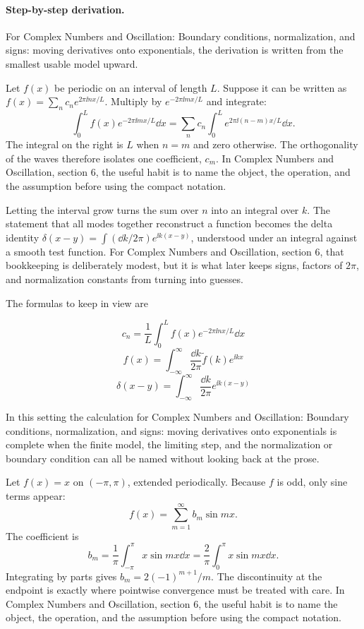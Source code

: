 \paragraph{Step-by-step derivation.}

For Complex Numbers and Oscillation: Boundary conditions, normalization, and signs: moving derivatives onto exponentials, the derivation is written from the smallest usable model upward.

Let \(f(x)\) be periodic on an interval of length \(L\).  Suppose it can be written as \(f(x)=\sum_n c_ne^{2\pi\ii nx/L}\).  Multiply by \(e^{-2\pi\ii mx/L}\) and integrate:
\[
  \int_0^L f(x)e^{-2\pi\ii mx/L}\dd x
  =
  \sum_n c_n\int_0^L e^{2\pi\ii(n-m)x/L}\dd x.
\]
The integral on the right is \(L\) when \(n=m\) and zero otherwise.  The orthogonality of the waves therefore isolates one coefficient, \(c_m\).  In Complex Numbers and Oscillation, section 6, the useful habit is to name the object, the operation, and the assumption before using the compact notation.

Letting the interval grow turns the sum over \(n\) into an integral over \(k\).  The statement that all modes together reconstruct a function becomes the delta identity \(\delta(x-y)=\int(\dd k/2\pi)e^{\ii k(x-y)}\), understood under an integral against a smooth test function.  For Complex Numbers and Oscillation, section 6, that bookkeeping is deliberately modest, but it is what later keeps signs, factors of \(2\pi\), and normalization constants from turning into guesses.

The formulas to keep in view are

\[
  c_n=\frac1L\int_0^L f(x)e^{-2\pi\ii nx/L}\dd x
\]
\[
  f(x)=\int_{-\infty}^{\infty}\frac{\dd k}{2\pi}\tilde f(k)e^{\ii kx}
\]
\[
  \delta(x-y)=\int_{-\infty}^{\infty}\frac{\dd k}{2\pi}e^{\ii k(x-y)}
\]

In this setting the calculation for Complex Numbers and Oscillation: Boundary conditions, normalization, and signs: moving derivatives onto exponentials is complete when the finite model, the limiting step, and the normalization or boundary condition can all be named without looking back at the prose.




\begin{example}
Let \(f(x)=x\) on \((-\pi,\pi)\), extended periodically.  Because \(f\) is odd, only sine terms appear:
\[
  f(x)=\sum_{m=1}^\infty b_m\sin mx.
\]
The coefficient is
\[
  b_m=\frac1\pi\int_{-\pi}^\pi x\sin mx\dd x
  =\frac2\pi\int_0^\pi x\sin mx\dd x.
\]
Integrating by parts gives \(b_m=2(-1)^{m+1}/m\).  The discontinuity at the endpoint is exactly where pointwise convergence must be treated with care.  In Complex Numbers and Oscillation, section 6, the useful habit is to name the object, the operation, and the assumption before using the compact notation.
\end{example}



